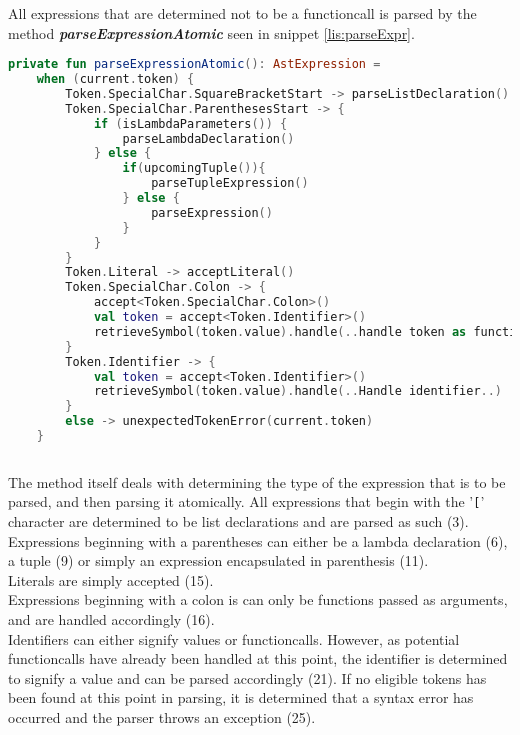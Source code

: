 All expressions that are determined not to be a functioncall is parsed by the method \textbf{\textit{parseExpressionAtomic}} seen in snippet \ref{lis:parseExpr}.

\begin{lstlisting}[language=Kotlin,label=lis:parseExpr,caption=A simplified version of the parseExpressionAtomic method from the parser.]
private fun parseExpressionAtomic(): AstExpression =
    when (current.token) {
        Token.SpecialChar.SquareBracketStart -> parseListDeclaration()
        Token.SpecialChar.ParenthesesStart -> {
            if (isLambdaParameters()) {
                parseLambdaDeclaration()
            } else {
                if(upcomingTuple()){
                    parseTupleExpression()
                } else {
                    parseExpression()
                }
            }
        }
        Token.Literal -> acceptLiteral()
        Token.SpecialChar.Colon -> {
        	accept<Token.SpecialChar.Colon>()
        	val token = accept<Token.Identifier>()
        	retrieveSymbol(token.value).handle(..handle token as function..)
        }
        Token.Identifier -> {
            val token = accept<Token.Identifier>()
            retrieveSymbol(token.value).handle(..Handle identifier..)
        }
        else -> unexpectedTokenError(current.token)
    }
            
\end{lstlisting}

The method itself deals with determining the type of the expression that is to be parsed, and then parsing it atomically.
All expressions that begin with the '\texttt{[}' character are determined to be list declarations and are parsed as such (3).\\
Expressions beginning with a parentheses can either be a lambda declaration (6), a tuple (9) or simply an expression encapsulated in parenthesis (11).\\
Literals are simply accepted (15).\\
Expressions beginning with a colon is can only be functions passed as arguments, and are handled accordingly (16).\\
Identifiers can either signify values or functioncalls.
However, as potential functioncalls have already been handled at this point, the identifier is determined to signify a value and can be parsed accordingly (21).
If no eligible tokens has been found at this point in parsing, it is determined that a syntax error has occurred and the parser throws an exception (25).


